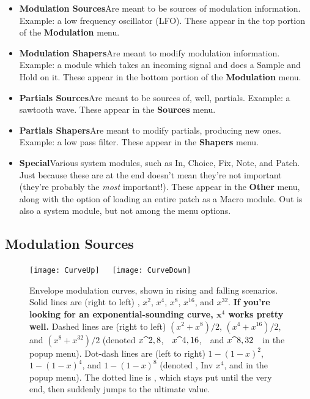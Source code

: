 \documentclass{article}
\begin{document}
\begin{itemize}
\item {\bf Modulation Sources}\quad Are meant to be sources of modulation information.  Example: a low frequency oscillator (LFO).  These appear in the top portion of the {\bf Modulation} menu.
\item {\bf Modulation Shapers}\quad Are meant to modify modulation information.  Example: a module which takes an incoming signal and does a Sample and Hold on it.     These appear in the bottom portion of the {\bf Modulation} menu.
\item {\bf Partials Sources}\quad Are meant to be sources of, well, partials.  Example: a sawtooth wave.    These appear in the {\bf Sources} menu.
\item {\bf Partials Shapers}\quad Are meant to modify partials, producing new ones.  Example: a low pass filter.  These appear in the {\bf Shapers} menu.

\item {\bf Special}\quad Various system modules, such as In, Choice, Fix, Note, and Patch.  Just because these are at the end doesn't mean they're not important (they're probably the {\it most} important!).  These appear in the {\bf Other} menu, along with the option of loading an entire patch as a Macro module.  Out is also a system module, but not among the menu options.  
\end{itemize}


\subsection{Modulation Sources}
\label{modsources}

\begin{wrapfigure}{r}{3.1in}
\vspace{-1.25em}
\texttt{[image: CurveUp]}~~~\texttt{[image: CurveDown]}
\caption{Envelope modulation curves, shown in rising and falling scenarios.  Solid lines are (right to left) {\color{NavyBlue}{\it Linear}}, {\color{Tan}\(x^2\)}, {\color{LimeGreen}\(x^4\)}, {\color{Red}\(x^8\)}, {\color{Periwinkle}\(x^{16}\)}, and {\color{Mahogany}\(x^{32}\)}.  {\bf If you're looking for an exponential-sounding curve, \(\bm x^4\) works pretty well.}  Dashed lines are (right to left) {\color{YellowOrange}\((x^2 + x^8)/2\)},  {\color{Fuchsia}\((x^4 + x^{16})/2\)}, and  {\color{OliveGreen}\((x^8 + x^{32})/2\)} (denoted {\color{YellowOrange}\(x$\mbox{\textasciicircum}$ 2, 8\)},\ \  {\color{Fuchsia}\(x$\mbox{\textasciicircum}$ 4, 16\)},\ \  and {\color{OliveGreen}\(x$\mbox{\textasciicircum}$ 8, 32\)}\ \  in the popup menu).  Dot-dash lines are (left to right) {\color{Red}\(1-(1-x)^2\)}, {\color{RoyalBlue}\(1-(1-x)^4\)}, and {\color{BurntOrange}\(1-(1-x)^8\)} (denoted {\color{Red}{\it Inv \(x^2\)}, {\color{RoyalBlue}Inv \(x^4\)},} and {\color{BurntOrange}{\it Inv \(x^8\)}} in the popup menu).  The dotted line is {\color{Cerulean}{\it Step}}, which stays put until the very end, then suddenly jumps to the ultimate value. }
\label{curves}
\end{wrapfigure}
\end{document}
